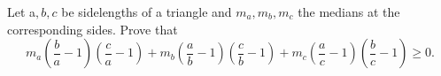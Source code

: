 Let a$,b,c$ be sidelengths of a triangle and $m_a,m_b,m_c$ the medians at the corresponding sides. Prove that$$m_a\left(\frac{b}{a}-1\right)\left(\frac{c}{a}-1\right)+ 
m_b\left(\frac{a}{b}-1\right)\left(\frac{c}{b}-1\right) 
+m_c\left(\frac{a}{c}-1\right)\left(\frac{b}{c}-1\right)\geq 0.$$
